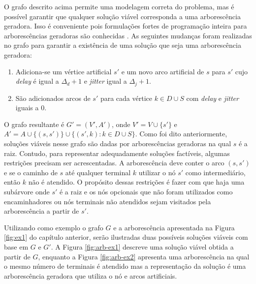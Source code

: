 O grafo descrito acima permite  uma modelagem correta do problema, mas
é  possível garantir  que qualquer  solução viável  corresponda a  uma
arborescência geradora. Isso é  conveniente pois formulações fortes de
programação  inteira  para  arborescências  geradoras  são  conhecidas
\cite{MAGNANTI1995503}.   As seguintes  mudanças  foram realizadas  no
grafo  para  garantir  a  existência  de  uma  solução  que  seja  uma
arborescência geradora:

\begin{enumerate}
    \item  Adiciona-se  um vértice  artificial  $s'$  e um  novo  arco
      artificial  de  $s$ para  $s'$  cujo  \textit{delay} é  igual  a
      $\Delta_d + 1$ e \textit{jitter} igual a $\Delta_j + 1$.
    \item São  adicionados arcos de  $s'$ para  cada vértice $k  \in D
      \cup S$ com \textit{delay} e \textit{jitter} iguais a 0.
\end{enumerate}


O grafo resultante é $G' = (V', A')$,  onde $V' = V \cup \{s'\}$ e $A'
= A \cup \{(s, s')\} \cup \{(s', k) : k \in D \cup S\}$. Como foi dito
anteriormente,   soluções   viáveis   nesse  grafo   são   dadas   por
arborescências  geradoras  na  qual  $s$  é  a  raiz.   Contudo,  para
representar  adequadamente  soluções   factíveis,  algumas  restrições
precisam ser acrescentadas.   A arborescência deve conter  o arco $(s,
s')$ e  se o caminho  de $s$ até qualquer  terminal $k$ utilizar  o nó
$s'$ como intermediário, então $k$  não é atendido. O propósito dessas
restrições é fazer com que haja uma  subárvore onde $s'$ é a raiz e os
nós  opcionais que  não foram  utilizados como  encaminhadores ou  nós
terminais não atendidos sejam visitados pela arborescência a partir de
$s'$.

Utilizando como exemplo  o grafo $G$ e a  arborescência apresentada na
Figura  \ref{fig:ex1}  do  capítulo anterior,  serão  ilustradas  duas
possíveis  soluções  viáveis  com  base  em  $G$  e  $G'$.   A  Figura
\ref{fig:arb-ex1} descreve uma solução viável  obtida a partir de $G$,
enquanto  a Figura  \ref{fig:arb-ex2} apresenta  uma arborescência  na
qual o  mesmo número de  terminais é  atendido mas a  representação da
solução  é  uma  arborescência  geradora  que utiliza  o  nó  e  arcos
artificiais.

